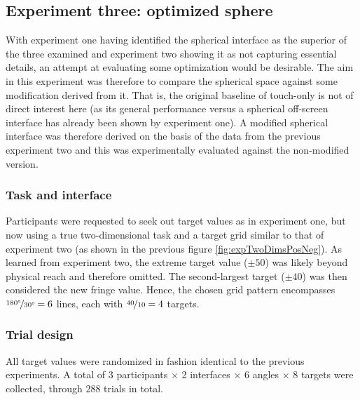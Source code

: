 %


\subsection{Experiment three: optimized sphere}

With experiment one having identified  the spherical interface as the superior of the three examined and experiment two   showing it as not capturing essential details, an attempt at evaluating some optimization would be desirable. The aim in this experiment was therefore to compare the spherical space against some modification derived  from it. That is, the original baseline of touch-only is not of direct interest here (as its general performance versus a spherical off-screen interface has already been shown by experiment one). A modified spherical interface was therefore derived on the basis of the data from the previous experiment two and this was experimentally  evaluated against the  non-modified version. 
 

\subsubsection{Task and interface}

Participants were requested to seek out target values as in experiment one, but now using a true two-dimensional task and  a target grid similar to that of experiment two (as shown in the previous figure \ref{fig:expTwoDimsPosNeg}). As learned from experiment two, the extreme target value ($\pm50$) was likely beyond physical reach and therefore omitted. The second-largest target ($\pm40$) was then considered the new fringe value. Hence, the chosen grid pattern encompasses $\nicefrac{180\degree}{30\degree}=6$ lines, each with $\nicefrac{40}{10}=4$ targets.


\subsubsection{Trial design}
	
All target values were randomized in fashion identical to the previous experiments.  A total of 3 participants $\times$ 2 interfaces $\times$ 6 angles $\times$ 8 targets were collected, through 288 trials in total.


